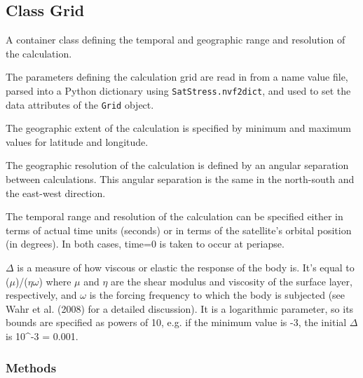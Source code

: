 
\subsection{Class Grid}

    \label{SatStress:GridCalc:Grid}
A container class defining the temporal and geographic range and resolution
of the calculation.

The parameters defining the calculation grid are read in from a name value 
file, parsed into a Python dictionary using \texttt{SatStress.nvf2dict}, 
and used to set the data attributes of the \texttt{Grid} object.

The geographic extent of the calculation is specified by minimum and 
maximum values for latitude and longitude.

The geographic resolution of the calculation is defined by an angular 
separation between calculations.  This angular separation is the same in 
the north-south and the east-west direction.

The temporal range and resolution of the calculation can be specified 
either in terms of actual time units (seconds) or in terms of the 
satellite's orbital position (in degrees).  In both cases, time=0 is taken 
to occur at periapse.

\(\Delta\) is a measure of how viscous or elastic the response of the body 
is.  It's equal to (\(\mu\))/(\(\eta\)\(\omega\)) where \(\mu\) and 
\(\eta\) are the shear modulus and viscosity of the surface layer, 
respectively, and \(\omega\) is the forcing frequency to which the body is 
subjected (see Wahr et al. (2008) for a detailed discussion).  It is a 
logarithmic parameter, so its bounds are specified as powers of 10, e.g. if
the minimum value is -3, the initial \(\Delta\) is 10{\textasciicircum}-3 =
0.001.



  \subsubsection{Methods}

